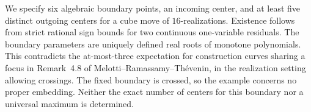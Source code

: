 We specify six algebraic boundary points, an incoming center, and at least five distinct outgoing centers for a cube move of $16$-realizations. Existence follows from strict rational sign bounds for two continuous one-variable residuals. The boundary parameters are uniquely defined real roots of monotone polynomials. This contradicts the at-most-three expectation for construction curves sharing a focus in Remark~4.8 of Melotti--Ramassamy--Th\'evenin, in the realization setting allowing crossings. The fixed boundary is crossed, so the example concerns no proper embedding. Neither the exact number of centers for this boundary nor a universal maximum is determined.
